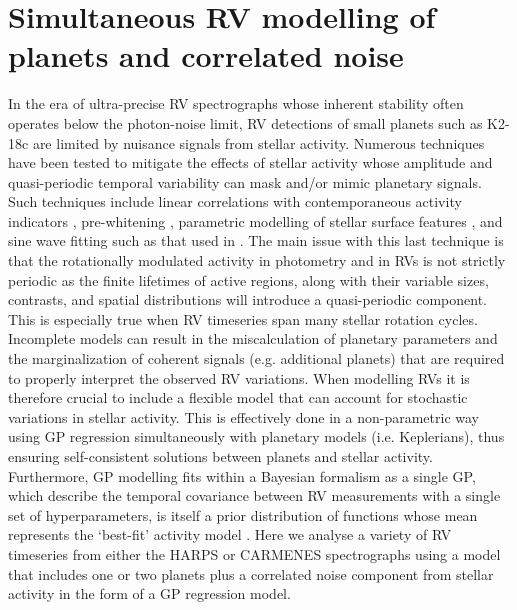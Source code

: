 \section{Simultaneous RV modelling of planets and correlated noise} \label{k2182sect:correlated}
In the era of ultra-precise RV spectrographs whose inherent stability often operates below the photon-noise limit,
RV detections of small planets such as K2-18c are limited by nuisance signals from stellar activity. Numerous
techniques have been tested to mitigate the effects of stellar activity whose amplitude and quasi-periodic temporal
variability can mask and/or mimic planetary signals. Such techniques include linear correlations with
contemporaneous activity indicators \citep[e.g.][]{boisse09},
pre-whitening \citep[e.g.][]{queloz09},
parametric modelling of stellar surface features \citep[e.g.][]{dumusque14},
and sine wave fitting such as that used in . The main issue with this last technique is that
the rotationally modulated activity in photometry and in RVs
is not strictly periodic as the finite lifetimes of active regions, along with
their variable sizes, contrasts, and spatial distributions will introduce a quasi-periodic component. This is
especially true when RV timeseries span many stellar rotation cycles.
Incomplete models can result in the miscalculation of planetary parameters and the marginalization of coherent
signals (e.g. additional planets) that are required to properly interpret the observed RV variations. When modelling RVs
it is therefore crucial to include a flexible model that can account for stochastic variations in stellar
activity. This is effectively done in a non-parametric way using GP  regression simultaneously with
planetary models (i.e. Keplerians), thus ensuring self-consistent solutions between planets and stellar activity.
Furthermore, GP modelling fits within a Bayesian formalism as a single GP, which describe the temporal covariance between RV
measurements with a single set of hyperparameters, is itself a prior distribution of functions whose mean represents
the `best-fit' activity model \citep{haywood14,faria16,cloutier17a}.
Here we analyse a variety of RV timeseries from either the HARPS
 or CARMENES  spectrographs using a model that includes one or two
planets plus a correlated noise component from stellar activity in the form of a GP regression model. \\

